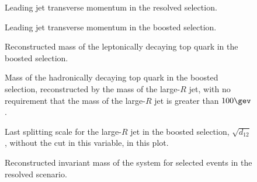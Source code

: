 


\begin{figure}
\centering
{}
\caption{Leading jet transverse momentum in the resolved selection.}
\label{fig:ttres7_resolved_leadingjetpt}
\end{figure}

\begin{figure}
\centering
{}
\caption{Leading jet transverse momentum in the boosted selection.}
\label{fig:ttres7_boosted_leadingjetpt}
\end{figure}

\begin{figure}
\centering
{}
\caption{Reconstructed mass of the leptonically decaying top quark in the boosted selection.}
\label{fig:ttres7_mtlep}
\end{figure}

\begin{figure}
\centering
{}
\caption{Mass of the hadronically decaying top quark in the boosted selection, reconstructed by the mass of the large-$R$ jet, with no requirement that the mass of the large-$R$ jet is greater than $100\gev$.}
\label{fig:ttres7_mthad}
\end{figure}

\begin{figure}
\centering
{}
\caption{Last splitting scale for the large-$R$ jet in the boosted selection, $\sqrt{d_{12}}$, without the cut in this variable, in this plot.}
\label{fig:ttres7_sqrtd12}
\end{figure}

\begin{sidewaysfigure}
\centering
{}
\caption{Reconstructed invariant mass of the \ttbar system for selected events in the resolved scenario.}
\label{fig:ttres7_resolved_mtt}
\end{sidewaysfigure}

